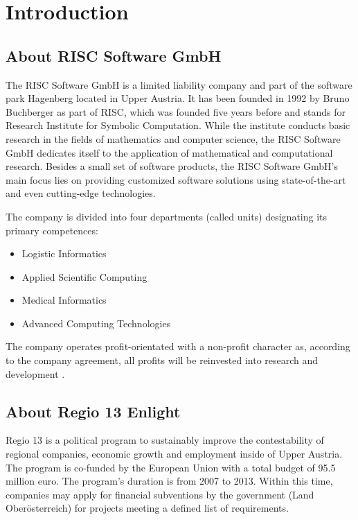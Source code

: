 \section{Introduction}

\subsection{About RISC Software GmbH}

The RISC Software GmbH is a limited liability company and part of the software park Hagenberg located in Upper Austria. It has been founded in 1992 by Bruno Buchberger as part of RISC, which was founded five years before and stands for Research Institute for Symbolic Computation. While the institute conducts basic research in the fields of mathematics and computer science, the RISC Software GmbH dedicates itself to the application of mathematical and computational research. Besides a small set of software products, the RISC Software GmbH's main focus lies on providing customized software solutions using state-of-the-art and even cutting-edge technologies.

The company is divided into four departments (called units) designating its primary competences:

\begin{itemize}
	\item Logistic Informatics
	\item Applied Scientific Computing
	\item Medical Informatics
	\item Advanced Computing Technologies
\end{itemize}

The company operates profit-orientated with a non-profit character as, according to the company agreement, all profits will be reinvested into research and development \cite{risc_website}.


\subsection{About Regio 13 Enlight}
\label{sec:about_enlight}

Regio 13 is a political program to sustainably improve the contestability of regional companies, economic growth and employment inside of Upper Austria. The program is co-funded by the European Union with a total budget of 95.5 million euro. The program's duration is from 2007 to 2013. Within this time, companies may apply for financial subventions by the government (Land Oberösterreich) for projects meeting a defined list of requirements.

